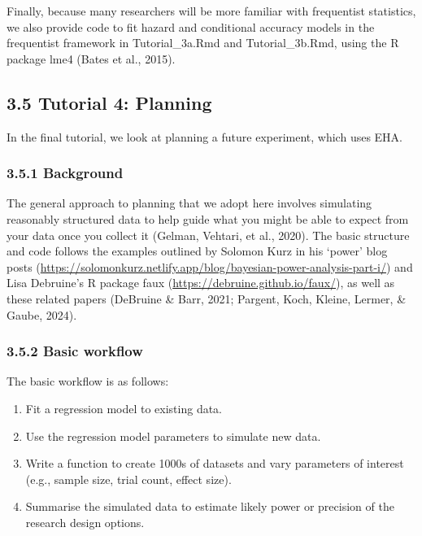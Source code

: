 \documentclass[
  english,
  man, donotrepeattitle,floatsintext]{apa6}
\providecommand{\tightlist}{%
  \setlength{\itemsep}{0pt}\setlength{\parskip}{0pt}}
\begin{document}
Finally, because many researchers will be more familiar with frequentist statistics, we also provide code to fit hazard and conditional accuracy models in the frequentist framework in Tutorial\_3a.Rmd and Tutorial\_3b.Rmd, using the R package lme4 (Bates et al., 2015).

\subsection{3.5 Tutorial 4: Planning}\label{tutorial-4-planning}

In the final tutorial, we look at planning a future experiment, which uses EHA.

\subsubsection{3.5.1 Background}\label{background}

The general approach to planning that we adopt here involves simulating reasonably structured data to help guide what you might be able to expect from your data once you collect it (Gelman, Vehtari, et al., 2020).
The basic structure and code follows the examples outlined by Solomon Kurz in his `power' blog posts (\url{https://solomonkurz.netlify.app/blog/bayesian-power-analysis-part-i/}) and Lisa Debruine's R package faux (\url{https://debruine.github.io/faux/}), as well as these related papers (DeBruine \& Barr, 2021; Pargent, Koch, Kleine, Lermer, \& Gaube, 2024).

\subsubsection{3.5.2 Basic workflow}\label{basic-workflow}

The basic workflow is as follows:

\begin{enumerate}
\def\labelenumi{\arabic{enumi}.}
\tightlist
\item
  Fit a regression model to existing data.
\item
  Use the regression model parameters to simulate new data.
\item
  Write a function to create 1000s of datasets and vary parameters of interest (e.g., sample size, trial count, effect size).
\item
  Summarise the simulated data to estimate likely power or precision of the research design options.
\end{enumerate}
\end{document}
